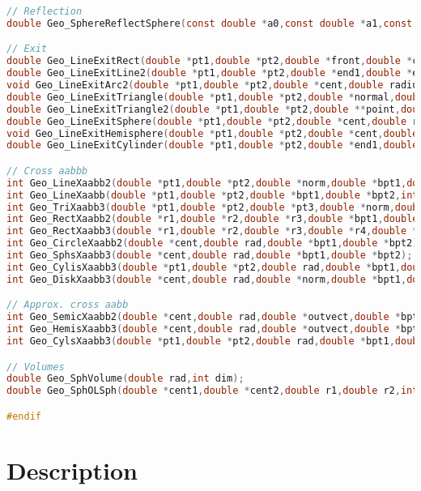 \documentclass[11pt]{article}
\begin{document}
\begin{lstlisting}[language=C]
// Reflection
double Geo_SphereReflectSphere(const double *a0,const double *a1,const double *b0,const double *b1,int dim,double radius2,double *a1p,double *b1p);

// Exit
double Geo_LineExitRect(double *pt1,double *pt2,double *front,double *corner1,double *corner3,double *exitpt,int *exitside);
double Geo_LineExitLine2(double *pt1,double *pt2,double *end1,double *end2,double *exitpt,int *exitend);
void Geo_LineExitArc2(double *pt1,double *pt2,double *cent,double radius,double *norm,double *exitpt,int *exitend);
double Geo_LineExitTriangle(double *pt1,double *pt2,double *normal,double *v1,double *v2,double *v3,double *exitpt,int *exitside);
double Geo_LineExitTriangle2(double *pt1,double *pt2,double **point,double *exitpt,int *exitside);
double Geo_LineExitSphere(double *pt1,double *pt2,double *cent,double rad,double *exitpt);
void Geo_LineExitHemisphere(double *pt1,double *pt2,double *cent,double rad,double *normal,double *exitpt);
double Geo_LineExitCylinder(double *pt1,double *pt2,double *end1,double *end2,double rad,double *exitpt,int *exitend);

// Cross aabbb
int Geo_LineXaabb2(double *pt1,double *pt2,double *norm,double *bpt1,double *bpt2);
int Geo_LineXaabb(double *pt1,double *pt2,double *bpt1,double *bpt2,int dim,int infline);
int Geo_TriXaabb3(double *pt1,double *pt2,double *pt3,double *norm,double *bpt1,double *bpt2);
int Geo_RectXaabb2(double *r1,double *r2,double *r3,double *bpt1,double *bpt2);
int Geo_RectXaabb3(double *r1,double *r2,double *r3,double *r4,double *bpt1,double *bpt2);
int Geo_CircleXaabb2(double *cent,double rad,double *bpt1,double *bpt2);
int Geo_SphsXaabb3(double *cent,double rad,double *bpt1,double *bpt2);
int Geo_CylisXaabb3(double *pt1,double *pt2,double rad,double *bpt1,double *bpt2);
int Geo_DiskXaabb3(double *cent,double rad,double *norm,double *bpt1,double *bpt2);

// Approx. cross aabb
int Geo_SemicXaabb2(double *cent,double rad,double *outvect,double *bpt1,double *bpt2);
int Geo_HemisXaabb3(double *cent,double rad,double *outvect,double *bpt1,double *bpt2);
int Geo_CylsXaabb3(double *pt1,double *pt2,double rad,double *bpt1,double *bpt2);

// Volumes
double Geo_SphVolume(double rad,int dim);
double Geo_SphOLSph(double *cent1,double *cent2,double r1,double r2,int dim);

#endif
\end{lstlisting}

\section{Description}
\end{document}
